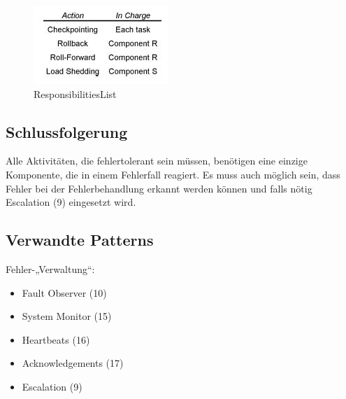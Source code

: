 \begin{figure}[H]
	\centering
	\includegraphics{content/faulttolerance/images/ResponsibilitiesList.JPG}
	\caption{ResponsibilitiesList}
\end{figure}


\subsection{Schlussfolgerung}

Alle Aktivitäten, die fehlertolerant sein müssen, benötigen eine einzige Komponente, die in einem Fehlerfall reagiert.
Es muss auch möglich sein, dass Fehler bei der Fehlerbehandlung erkannt werden können und falls nötig Escalation (9) eingesetzt wird.

\subsection{Verwandte Patterns}

Fehler-„Verwaltung“:
\begin{itemize}
	\item Fault Observer (10)
	\item System Monitor (15)
\end{itemize}

\begin{itemize}
	\item Heartbeats (16)
	\item Acknowledgements (17)
\end{itemize}

\begin{itemize}
	\item Escalation (9)
\end{itemize}

